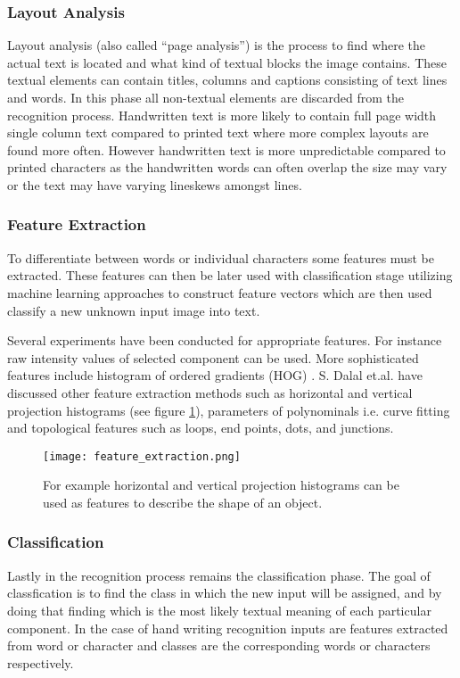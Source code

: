 \documentclass{article}
\begin{document}
      \subsubsection{Layout Analysis}
        Layout analysis (also called ``page analysis'') is the process to find where the actual text is located and what kind of textual blocks the image contains. These textual elements can contain titles, columns and captions consisting of text lines and words. In this phase all non-textual elements are discarded from the recognition process. Handwritten text is more likely to contain full page width single column text compared to printed text where more complex layouts are found more often. However handwritten text is more unpredictable compared to printed characters as the handwritten words can often overlap the size may vary or the text may have varying lineskews amongst lines.

      \subsubsection{Feature Extraction}
        To differentiate between words or individual characters some features must be extracted. These features can then be later used with classification stage utilizing machine learning approaches to construct feature vectors which are then used classify a new unknown input image into text.

        Several experiments have been conducted for appropriate features. For instance raw intensity values of selected component can be used. More sophisticated features include histogram of ordered gradients (HOG) \cite{Dalal2005}. S. Dalal et.al. have discussed other feature extraction methods such as horizontal and vertical projection histograms (see figure \ref{fig:feature}), parameters of polynominals i.e. curve fitting and topological features such as loops, end points, dots, and junctions. \cite{Dalal}

        \begin{figure}[!ht]
          \centering
          \texttt{[image: feature\_extraction.png]}
          \caption{For example horizontal and vertical projection histograms can be used as features to describe the shape of an object.\label{fig:feature}}
        \end{figure}

      \subsubsection{Classification}
        Lastly in the recognition process remains the classification phase. The goal of classfication is to find the class in which the new input will be assigned, and by doing that finding which is the most likely textual meaning of each particular component. In the case of hand writing recognition inputs are features extracted from word or character and classes are the corresponding words or characters respectively.
\end{document}

